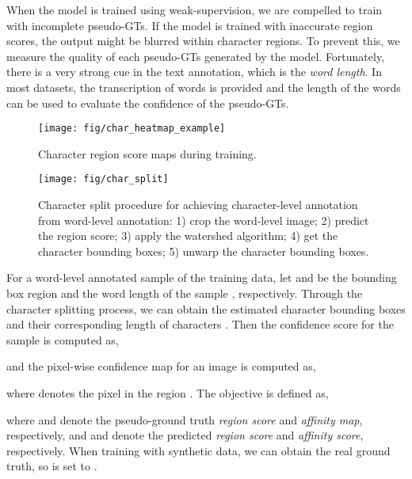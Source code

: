 \documentclass[10pt,twocolumn,letterpaper]{article}
\begin{document}
When the model is trained using weak-supervision, we are compelled to train with incomplete pseudo-GTs. 
If the model is trained with inaccurate region scores, the output might be blurred within character regions. 
To prevent this, we measure the quality of each pseudo-GTs generated by the model.
Fortunately, there is a very strong cue in the text annotation, which is the \textit{word length}. 
In most datasets, the transcription of words is provided and the length of the words can be used to evaluate the confidence of the pseudo-GTs.

\begin{figure}[t]
  \texttt{[image: fig/char\_heatmap\_example]}
\caption{Character region score maps during training.}
  \label{fig:scoremapduringtraining} 
\end{figure}

\begin{figure*}[h!]
  \centering
  \texttt{[image: fig/char\_split]}
\caption{Character split procedure for achieving character-level annotation from word-level annotation: 1) crop the word-level image; 2) predict the region score; 3) apply the watershed algorithm; 4) get the character bounding boxes; 5) unwarp the character bounding boxes.} 
  \label{fig:charactersplit} 
\end{figure*}

For a word-level annotated sample  of the training data, let  and  be the bounding box region and the word length of the sample , respectively.
Through the character splitting process, we can obtain the estimated character bounding boxes and their corresponding length of characters .
Then the confidence score  for the sample  is computed as,


and the pixel-wise confidence map  for an image is computed as, 

where  denotes the pixel in the region . 
The objective  is defined as,

where  and  denote the pseudo-ground truth \textit{region score} and \textit{affinity map}, respectively, and  and  denote the predicted \textit{region score} and \textit{affinity score}, respectively.
When training with synthetic data, we can obtain the real ground truth, so  is set to .
\end{document}
